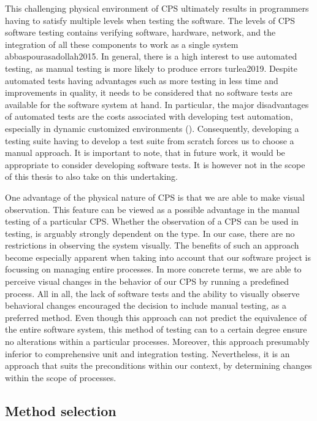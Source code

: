 This challenging physical environment of CPS ultimately results in programmers having to satisfy multiple levels when testing the software. The levels of CPS software testing contains verifying software, hardware, network, and the integration of all these components to work as a single system {abbaspourasadollah2015}. In general, there is a high interest to use automated testing, as manual testing is more likely to produce errors {turlea2019}. Despite automated tests having advantages such as more testing in less time and improvements in quality, it needs to be considered that no software tests are available for the software system at hand. In particular, the major disadvantages of automated tests are the costs associated with developing test automation, especially in dynamic customized environments (\cite{taipale2011}). Consequently, developing a testing suite having to develop a test suite from scratch forces us to choose a manual approach. It is important to note, that in future work, it would be appropriate to consider developing software tests. It is however not in the scope of this thesis to also take on this undertaking.

One advantage of the physical nature of CPS is that we are able to make visual observation. This feature can be viewed as a possible advantage in the manual testing of a particular CPS. Whether the observation of a CPS can be used in testing, is arguably strongly dependent on the type. In our case, there are no restrictions in observing the system visually. The benefits of such an approach become especially apparent when taking into account that our software project is focussing on managing entire processes. In more concrete terms, we are able to perceive visual changes in the behavior of our CPS by running a predefined process.  All in all, the lack of software tests and the ability to visually observe behavioral changes encouraged the decision to include manual testing,  as a preferred method. Even though this approach can not predict the equivalence of the entire software system, this method of testing can to a certain degree ensure no alterations within a particular processes. Moreover, this approach presumably inferior to comprehensive unit and integration testing. Nevertheless, it is an approach that suits the preconditions within our context, by determining changes within the scope of processes.

\subsection{Method selection}

